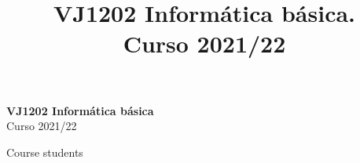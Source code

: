\documentclass[11pt,fleqn]{book}                                                          %
\begin{document}
\title{VJ1202 Informática básica. \\ Curso 2021/22}


\begingroup
\thispagestyle{empty}
\centering
\vspace*{5cm}
\par\normalfont\fontsize{35}{35}\sffamily\selectfont
\textbf{VJ1202 Informática básica}\\
{\LARGE Curso 2021/22}\par %
\vspace*{1cm}
{\Huge Course students}\par %
\endgroup




\pagestyle{empty}        %
\tableofcontents         %
\cleardoublepage         %
\pagestyle{fancy}        %



\end{document}
